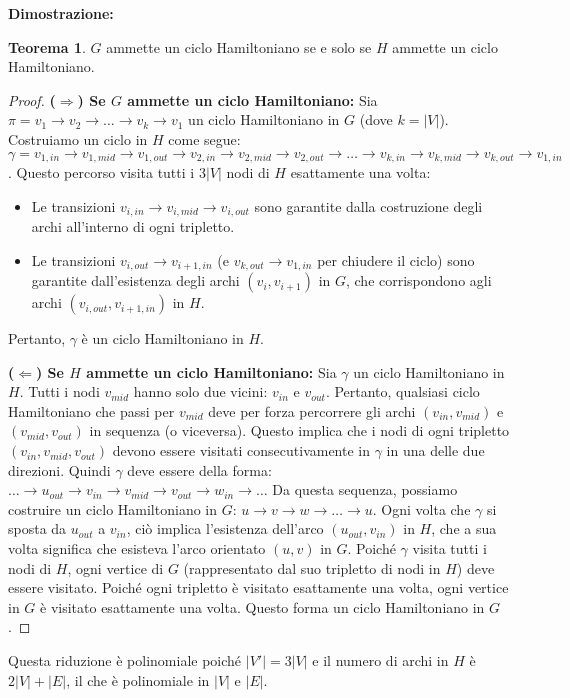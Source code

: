 \documentclass[a4paper]{article}
\theoremstyle{definition} %
\newtheorem{theorem}{Teorema}
\begin{document}
\textbf{Dimostrazione:}
\begin{theorem}
$G$ ammette un ciclo Hamiltoniano se e solo se $H$ ammette un ciclo Hamiltoniano.
\end{theorem}
\begin{proof}
\textbf{($\Rightarrow$) Se $G$ ammette un ciclo Hamiltoniano:}
Sia $\pi = v_1 \to v_2 \to \dots \to v_k \to v_1$ un ciclo Hamiltoniano in $G$ (dove $k=|V|$).
Costruiamo un ciclo in $H$ come segue:
$\gamma = v_{1,in} \to v_{1,mid} \to v_{1,out} \to v_{2,in} \to v_{2,mid} \to v_{2,out} \to \dots \to v_{k,in} \to v_{k,mid} \to v_{k,out} \to v_{1,in}$.
Questo percorso visita tutti i $3|V|$ nodi di $H$ esattamente una volta:
\begin{itemize}
    \item Le transizioni $v_{i,in} \to v_{i,mid} \to v_{i,out}$ sono garantite dalla costruzione degli archi all'interno di ogni tripletto.
    \item Le transizioni $v_{i,out} \to v_{i+1,in}$ (e $v_{k,out} \to v_{1,in}$ per chiudere il ciclo) sono garantite dall'esistenza degli archi $(v_i, v_{i+1})$ in $G$, che corrispondono agli archi $(v_{i,out}, v_{i+1,in})$ in $H$.
\end{itemize}
Pertanto, $\gamma$ è un ciclo Hamiltoniano in $H$.

\textbf{($\Leftarrow$) Se $H$ ammette un ciclo Hamiltoniano:}
Sia $\gamma$ un ciclo Hamiltoniano in $H$. Tutti i nodi $v_{mid}$ hanno solo due vicini: $v_{in}$ e $v_{out}$. Pertanto, qualsiasi ciclo Hamiltoniano che passi per $v_{mid}$ deve per forza percorrere gli archi $(v_{in}, v_{mid})$ e $(v_{mid}, v_{out})$ in sequenza (o viceversa). Questo implica che i nodi di ogni tripletto $(v_{in}, v_{mid}, v_{out})$ devono essere visitati consecutivamente in $\gamma$ in una delle due direzioni.
Quindi $\gamma$ deve essere della forma:
$\dots \to u_{out} \to v_{in} \to v_{mid} \to v_{out} \to w_{in} \to \dots$
Da questa sequenza, possiamo costruire un ciclo Hamiltoniano in $G$: $u \to v \to w \to \dots \to u$.
Ogni volta che $\gamma$ si sposta da $u_{out}$ a $v_{in}$, ciò implica l'esistenza dell'arco $(u_{out}, v_{in})$ in $H$, che a sua volta significa che esisteva l'arco orientato $(u, v)$ in $G$.
Poiché $\gamma$ visita tutti i nodi di $H$, ogni vertice di $G$ (rappresentato dal suo tripletto di nodi in $H$) deve essere visitato. Poiché ogni tripletto è visitato esattamente una volta, ogni vertice in $G$ è visitato esattamente una volta. Questo forma un ciclo Hamiltoniano in $G$.
\end{proof}
Questa riduzione è polinomiale poiché $|V'|=3|V|$ e il numero di archi in $H$ è $2|V| + |E|$, il che è polinomiale in $|V|$ e $|E|$.
\end{document}
